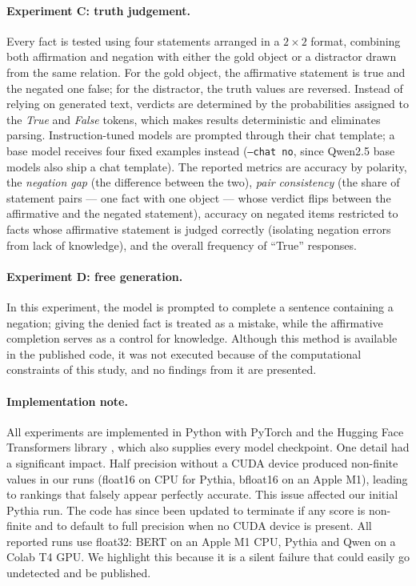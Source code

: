 \documentclass{article}
\begin{document}
\paragraph{Experiment C: truth judgement.} Every fact is tested using four statements arranged in a $2 \times 2$ format, combining both affirmation and negation with either the gold object or a distractor drawn from the same relation. For the gold object, the affirmative statement is true and the negated one false; for the distractor, the truth values are reversed. Instead of relying on generated text, verdicts are determined by the probabilities assigned to the \emph{True} and \emph{False} tokens, which makes results deterministic and eliminates parsing. Instruction-tuned models are prompted through their chat template; a base model receives four fixed examples instead (\texttt{--chat no}, since Qwen2.5 base models also ship a chat template). The reported metrics are accuracy by polarity, the \emph{negation gap} (the difference between the two), \emph{pair consistency} (the share of statement pairs --- one fact with one object --- whose verdict flips between the affirmative and the negated statement), accuracy on negated items restricted to facts whose affirmative statement is judged correctly (isolating negation errors from lack of knowledge), and the overall frequency of ``True'' responses.

\paragraph{Experiment D: free generation.} In this experiment, the model is prompted to complete a sentence containing a negation; giving the denied fact is treated as a mistake, while the affirmative completion serves as a control for knowledge. Although this method is available in the published code, it was not executed because of the computational constraints of this study, and no findings from it are presented.

\paragraph{Implementation note.} All experiments are implemented in Python with PyTorch
\citep{paszke2019} and the Hugging Face Transformers library \citep{wolf2020}, which also supplies
every model checkpoint. One detail had a significant impact. Half precision without a CUDA device produced non-finite values in our runs (float16 on CPU for Pythia, bfloat16 on an Apple M1), leading to rankings that falsely appear perfectly accurate. This issue affected our initial Pythia run. The code has since been updated to terminate if any score is non-finite and to default to full precision when no CUDA device is present. All reported runs use float32: BERT on an Apple M1 CPU, Pythia and Qwen on a Colab T4 GPU.  We highlight this because it is a silent failure that could easily go undetected and be published.
\end{document}
